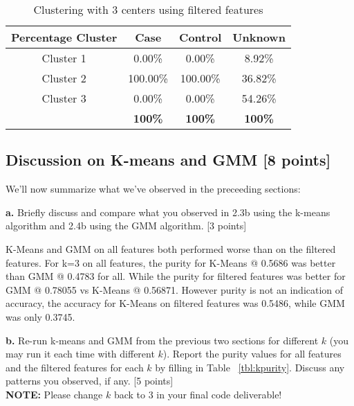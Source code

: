 \documentclass[12pt]{article}
\begin{document}
\begin{table}[h]
\centering
\begin{tabular}{ c | c | c | c }
  \hline
  Percentage Cluster & Case & Control & Unknown\\
  \hline                       
  Cluster 1 & 0.00\% & 0.00\% & 8.92\% \\
  Cluster 2 & 100.00\% & 100.00\% & 36.82\% \\
  Cluster 3 & 0.00\% & 0.00\% & 54.26\% \\
  \hline  
   & \bf{100\%} & \bf{100\%} & \bf{100\%} \\
  \hline  
\end{tabular}
\caption{Clustering with 3 centers using filtered features}
\label{tbl:skmeansfil}
\end{table}




\pagebreak
\subsection{Discussion on K-means and GMM [8 points]}

We'll now summarize what we've observed in the preceeding sections:

\textbf{a.} Briefly discuss and compare what you observed in 2.3b using the k-means algorithm and 2.4b using the GMM algorithm. [3 points]

\vspace{5mm}

K-Means and GMM on all features both performed worse than on the filtered features.  For k=3 on all features, the purity for K-Means @ 0.5686 was better than GMM @ 0.4783 for all.  While the purity for filtered features was better for GMM @ 0.78055 vs K-Means @ 0.56871.  However purity is not an indication of accuracy, the accuracy for K-Means on filtered features was 0.5486, while GMM was only 0.3745.


\vspace{5mm}

\textbf{b.} Re-run k-means and GMM from the previous two sections for different $k$ (you may run it each time with different $k$). Report the purity values for all features and the filtered features for each $k$ by filling in Table ~\ref{tbl:kpurity}. Discuss any patterns you observed, if any. [5 points]\\

\textbf{NOTE:} Please change $k$ back to 3 in your final code deliverable!
\end{document}
